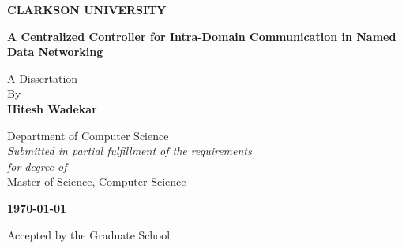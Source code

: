 
\begin{titlepage}
		\begin{center}
			\Large
			\textbf{CLARKSON UNIVERSITY}

			\LARGE
			\vspace{1.5cm}
			\textbf{A Centralized Controller for Intra-Domain Communication in Named Data Networking}
			\vspace{1.5cm}

			\large
			\doublespacing
			A Dissertation\\
			By\\

			\vspace{0.5cm}
			\textbf{Hitesh Wadekar}
			\vspace{0.75cm}

			\large
			Department of Computer Science\\
			\textit{Submitted in partial fulfillment of the requirements\\
			for degree of\\}
			Master of Science, Computer Science

			\vspace{0.8cm}
			\textbf{\today}

			\vfill
			\normalsize
			\begin{flushright}
				Accepted by the Graduate School
			\end{flushright}

			\hfill\makebox[1in]{\hrulefill,} \makebox[2in]{\hrulefill}
			\par\hfill{} 
		\end{center}
\end{titlepage}